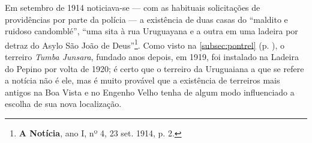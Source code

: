 Em setembro de 1914 noticiava-se --- com as habituais solicitações de providências por parte da polícia --- a existência de duas casas do ``maldito e ruidoso candomblé'', ``uma sita à rua Uruguayana e a outra em uma ladeira por detraz do Asylo São João de Deus''\footnote{\textbf{A Notícia}, ano I, nº 4, 23 set. 1914, p. 2.}. Como visto na \autoref{subsec:pontrel} (p. \pageref{subsec:pontrel}), o terreiro \textit{Tumba Junsara}, fundado anos depois, em 1919, foi instalado na Ladeira do Pepino por volta de 1920; é certo que o terreiro da Uruguaiana a que se refere a notícia não é ele, mas é muito provável que a existência de terreiros mais antigos na Boa Vista e no Engenho Velho tenha de algum modo influenciado a escolha de sua nova localização.

